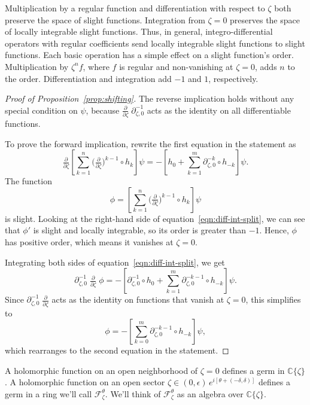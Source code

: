 \documentclass{article}
\theoremstyle{plain}
\newcommand{\C}{\mathbb{C}}
\newcommand{\fracderiv}[3]{\partial^{#1}_{#2, #3}}
\begin{document}
Multiplication by a regular function and differentiation with respect to $\zeta$ both preserve the space of slight functions. Integration from $\zeta = 0$ preserves the space of locally integrable slight functions. Thus, in general, integro-differential operators with regular coefficients send locally integrable slight functions to slight functions. Each basic operation has a simple effect on a slight function's order. Multiplication by $\zeta^n f$, where $f$ is regular and non-vanishing at $\zeta = 0$, adds $n$ to the order. Differentiation and integration add $-1$ and $1$, respectively.
\begin{proof}[Proof of Proposition~\ref{prop:shifting}]
The reverse implication holds without any special condition on $\psi$, because $\tfrac{\partial}{\partial \zeta}\;\fracderiv{-1}{\zeta}{0}$ acts as the identity on all differentiable functions.

To prove the forward implication, rewrite the first equation in the statement as
\begin{equation}\label{eqn:diff-int-split}
\tfrac{\partial}{\partial \zeta} \left[ \sum_{k = 1}^n \big(\tfrac{\partial}{\partial \zeta}\big)^{k-1} \circ h_k \right] \psi = -\left[ h_0 + \sum_{k = 1}^m \fracderiv{-k}{\zeta}{0} \circ h_{-k} \right] \psi.
\end{equation}
The function
\[ \phi = \left[ \sum_{k = 1}^n \big(\tfrac{\partial}{\partial \zeta}\big)^{k-1} \circ h_k \right] \psi \]
is slight. Looking at the right-hand side of equation~\ref{eqn:diff-int-split}, we can see that $\phi'$ is slight and locally integrable, so its order is greater than $-1$. Hence, $\phi$ has positive order, which means it vanishes at $\zeta = 0$.

Integrating both sides of equation~\ref{eqn:diff-int-split}, we get
\[ \fracderiv{-1}{\zeta}{0}\;\tfrac{\partial}{\partial \zeta}\;\phi = -\left[ \fracderiv{-1}{\zeta}{0} \circ h_0 + \sum_{k = 1}^m \fracderiv{-k-1}{\zeta}{0} \circ h_{-k} \right] \psi. \]
Since $\fracderiv{-1}{\zeta}{0}\;\tfrac{\partial}{\partial \zeta}$ acts as the identity on functions that vanish at $\zeta = 0$, this simplifies to
\[ \phi = -\left[ \sum_{k = 0}^m \fracderiv{-k-1}{\zeta}{0} \circ h_{-k} \right] \psi, \]
which rearranges to the second equation in the statement.
\end{proof}

\color{magenta}
A holomorphic function on an open neighborhood of $\zeta = 0$ defines a germ in $\C\{\zeta\}$. A holomorphic function on an open sector $\zeta \in (0, \epsilon)\,e^{i[\theta + (-\delta, \delta)]}$ defines a germ in a ring we'll call $\mathcal{F}_\zeta^\theta$. We'll think of $\mathcal{F}_\zeta^\theta$ as an algebra over $\C\{\zeta\}$.
\end{document}
